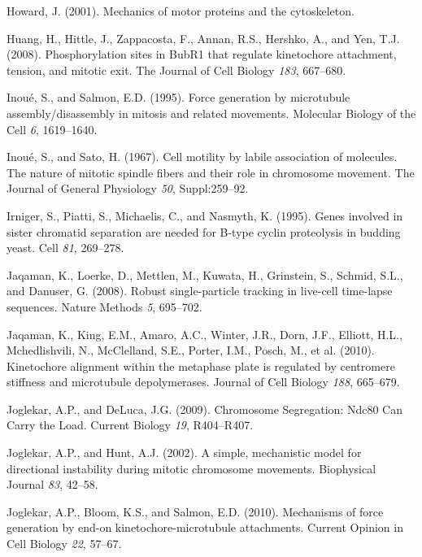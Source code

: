 \documentclass[12pt,a4paper,twoside,openright]{book}
\begin{document}
\hypertarget{ref-Howard2001}{}
Howard, J. (2001). Mechanics of motor proteins and the cytoskeleton.

\hypertarget{ref-Huang2008}{}
Huang, H., Hittle, J., Zappacosta, F., Annan, R.S., Hershko, A., and
Yen, T.J. (2008). Phosphorylation sites in BubR1 that regulate
kinetochore attachment, tension, and mitotic exit. The Journal of Cell
Biology \emph{183}, 667--680.

\hypertarget{ref-Inoue1995}{}
Inoué, S., and Salmon, E.D. (1995). Force generation by microtubule
assembly/disassembly in mitosis and related movements. Molecular Biology
of the Cell \emph{6}, 1619--1640.

\hypertarget{ref-Inoue1967}{}
Inoué, S., and Sato, H. (1967). Cell motility by labile association of
molecules. The nature of mitotic spindle fibers and their role in
chromosome movement. The Journal of General Physiology \emph{50},
Suppl:259--92.

\hypertarget{ref-Irniger1995}{}
Irniger, S., Piatti, S., Michaelis, C., and Nasmyth, K. (1995). Genes
involved in sister chromatid separation are needed for B-type cyclin
proteolysis in budding yeast. Cell \emph{81}, 269--278.

\hypertarget{ref-Jaqaman2008}{}
Jaqaman, K., Loerke, D., Mettlen, M., Kuwata, H., Grinstein, S., Schmid,
S.L., and Danuser, G. (2008). Robust single-particle tracking in
live-cell time-lapse sequences. Nature Methods \emph{5}, 695--702.

\hypertarget{ref-Jaqaman2010}{}
Jaqaman, K., King, E.M., Amaro, A.C., Winter, J.R., Dorn, J.F., Elliott,
H.L., Mchedlishvili, N., McClelland, S.E., Porter, I.M., Posch, M., et
al. (2010). Kinetochore alignment within the metaphase plate is
regulated by centromere stiffness and microtubule depolymerases. Journal
of Cell Biology \emph{188}, 665--679.

\hypertarget{ref-Joglekar2009}{}
Joglekar, A.P., and DeLuca, J.G. (2009). Chromosome Segregation: Ndc80
Can Carry the Load. Current Biology \emph{19}, R404--R407.

\hypertarget{ref-Joglekar2002}{}
Joglekar, A.P., and Hunt, A.J. (2002). A simple, mechanistic model for
directional instability during mitotic chromosome movements. Biophysical
Journal \emph{83}, 42--58.

\hypertarget{ref-Joglekar2010a}{}
Joglekar, A.P., Bloom, K.S., and Salmon, E.D. (2010). Mechanisms of
force generation by end-on kinetochore-microtubule attachments. Current
Opinion in Cell Biology \emph{22}, 57--67.
\end{document}

